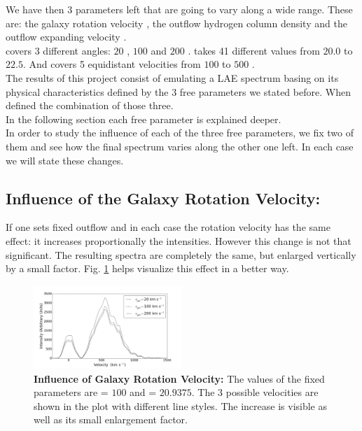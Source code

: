 We have then 3 parameters left that are going to vary along a wide range. These are: the galaxy rotation velocity \vrot, the outflow hydrogen column density \nh and the outflow expanding velocity \vout. \\

\vrot covers 3 different angles: $20$ \kms, $100$ \kms and $200$ \kms. \lognh takes 41 different values from $20.0$ to $22.5$. And \vout covers 5 equidistant velocities from $100$ \kms to $500$ \kms.  \\ 

The results of this project consist of emulating a LAE spectrum basing on its physical characteristics defined by the 3 free parameters we stated before. When defined the combination of those three. \\

In the following section each free parameter is explained deeper. \\

In order to study the influence of each of the three free parameters, we fix two of them and see how the final spectrum varies along the other one left. In each case we will state these changes.\\

\subsection{Influence of the Galaxy Rotation Velocity: \vrot}

If one sets fixed outflow \vout and \lognh in each case the rotation velocity has the same effect: it increases proportionally the intensities. However this change is not that significant. The resulting spectra are completely the same, but enlarged vertically by a small factor. Fig. \ref{fig:influence_vrot} helps visualize this effect in a better way.\\

\begin{figure}[h!]
	\begin{center}
		\includegraphics[width=0.5\textwidth]{./figures/appendix/inf_vgal_soft.png}
	\end{center}
	\caption{\textbf{Influence of Galaxy Rotation Velocity:} The values of the fixed parameters are \vout = $100$ \kms and \lognh = $20.9375$. The 3 possible velocities are shown in the plot with different line styles. The increase is visible as well as its small enlargement factor.}
	\label{fig:influence_vrot}
\end{figure}

